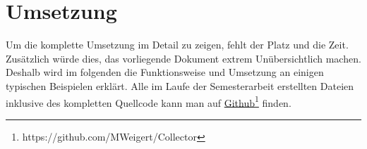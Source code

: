 \chapter{Umsetzung}
\label{ch:Umsetzung}

Um die komplette Umsetzung im Detail zu zeigen, fehlt der Platz und die Zeit. Zusätzlich würde dies, das vorliegende Dokument extrem Unübersichtlich machen. Deshalb wird im folgenden die Funktionsweise und Umsetzung an einigen typischen Beispielen erklärt. Alle im Laufe der Semesterarbeit erstellten Dateien inklusive des kompletten Quellcode kann man auf \href{https://github.com/MWeigert/Collector}{Github}\footnote{https://github.com/MWeigert/Collector} finden.\\





